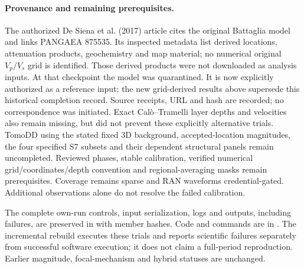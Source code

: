 \paragraph{Provenance and remaining prerequisites.}
The authorized De Siena et al. (2017) article cites the original Battaglia model and links PANGAEA 875535. Its inspected metadata list derived locations, attenuation products, geochemistry and map material; no numerical original $V_p/V_s$ grid is identified. Those derived products were not downloaded as analysis inputs. At that checkpoint the model was quarantined. It is now explicitly authorized as a reference input; the new grid-derived results above supersede this historical completion record. Source receipts, URL and hash are recorded; no correspondence was initiated. Exact Cal\`o--Tramelli layer depths and velocities also remain missing, but did not prevent these explicitly alternative trials. TomoDD using the stated fixed 3D background, accepted-location magnitudes, the four specified S7 subsets and their dependent structural panels remain uncompleted. Reviewed phases, stable calibration, verified numerical grid/coordinates/depth convention and regional-averaging masks remain prerequisites. Coverage remains sparse and RAN waveforms credential-gated. Additional observations alone do not resolve the failed calibration.

The complete own-run controls, input serialization, logs and outputs, including failures, are preserved in  with member hashes. Code and commands are in . The incremental rebuild executes these trials and reports scientific failures separately from successful software execution; it does not claim a full-period reproduction. Earlier magnitude, focal-mechanism and hybrid statuses are unchanged.
